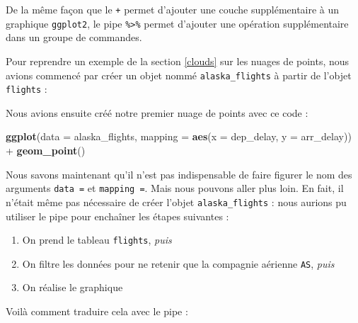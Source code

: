 \documentclass[a4paperpaper,]{article}
\newenvironment{Shaded}{\begin{snugshade}}{\end{snugshade}}
\newcommand{\DataTypeTok}[1]{\textcolor[rgb]{0.00,0.34,0.68}{#1}}
\newcommand{\KeywordTok}[1]{\textcolor[rgb]{0.12,0.11,0.11}{\textbf{#1}}}
\newcommand{\NormalTok}[1]{\textcolor[rgb]{0.12,0.11,0.11}{#1}}
\newcommand{\OperatorTok}[1]{\textcolor[rgb]{0.12,0.11,0.11}{#1}}
\newcommand{\StringTok}[1]{\textcolor[rgb]{0.75,0.01,0.01}{#1}}
\providecommand{\tightlist}{%
  \setlength{\itemsep}{0pt}\setlength{\parskip}{0pt}}
\theoremstyle{definition}
\theoremstyle{definition}
\theoremstyle{definition}
\theoremstyle{remark}
\begin{document}
De la même façon que le \texttt{+} permet d'ajouter une couche
supplémentaire à un graphique \texttt{ggplot2}, le pipe
\texttt{\%\textgreater{}\%} permet d'ajouter une opération
supplémentaire dans un groupe de commandes.

Pour reprendre un exemple de la section \ref{clouds} sur les nuages de
points, nous avions commencé par créer un objet nommé
\texttt{alaska\_flights} à partir de l'objet \texttt{flights} :

\begin{Shaded}
\end{Shaded}

Nous avions ensuite créé notre premier nuage de points avec ce code :

\begin{Shaded}
\begin{Highlighting}[]
\KeywordTok{ggplot}\NormalTok{(}\DataTypeTok{data =}\NormalTok{ alaska_flights, }\DataTypeTok{mapping =} \KeywordTok{aes}\NormalTok{(}\DataTypeTok{x =}\NormalTok{ dep_delay, }\DataTypeTok{y =}\NormalTok{ arr_delay)) }\OperatorTok{+}\StringTok{ }
\StringTok{  }\KeywordTok{geom_point}\NormalTok{()}
\end{Highlighting}
\end{Shaded}

Nous savons maintenant qu'il n'est pas indispensable de faire figurer le
nom des arguments \texttt{data\ =} et \texttt{mapping\ =}. Mais nous
pouvons aller plus loin. En fait, il n'était même pas nécessaire de
créer l'objet \texttt{alaska\_flights} : nous aurions pu utiliser le
pipe pour enchaîner les étapes suivantes :

\begin{enumerate}
\def\labelenumi{\arabic{enumi}.}
\tightlist
\item
  On prend le tableau \texttt{flights}, \emph{puis}
\item
  On filtre les données pour ne retenir que la compagnie aérienne
  \texttt{AS}, \emph{puis}
\item
  On réalise le graphique
\end{enumerate}

Voilà comment traduire cela avec le pipe :

\begin{Shaded}
\end{Shaded}
\end{document}
